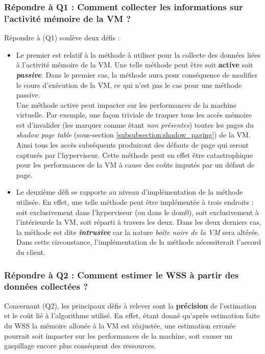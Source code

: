 \subsubsection{Répondre à Q1 : Comment collecter les informations sur l'activité mémoire de la VM ?}
Répondre à (Q1) soulève deux défis :
\begin{itemize}
    \item Le premier est relatif à la méthode à utiliser pour la collecte des données liées à l'activité mémoire de la VM. Une telle méthode peut être soit \textbf{active} soit \textbf{\textit{passive}}. Dans le premier cas, la méthode aura pour conséquence de modifier le cours d'exécution de la VM, ce qui n'est pas le cas pour une méthode passive.\\
    Une méthode active peut impacter sur les performances de la machine virtuelle. Par exemple, une façon triviale de traquer tous les accès mémoire est d'invalider (les marquer comme étant \textit{non présentes}) toutes les pages du \textit{shadow page table} (sous-section \ref{subsubsection:shadow_paging}) de la VM. Ainsi tous les accès subséquents produiront des défauts de page qui seront capturés par l'hyperviseur. Cette méthode peut en effet être catastrophique pour les performances de la VM à cause des coûts imputés par un défaut de page.
    
    \item Le deuxième défi se rapporte au niveau d'implémentation de la méthode utilisée. En effet, une telle méthode peut être implémentée à trois endroits : soit exclusivement dans l'hyperviseur (ou dans le dom0), soit exclusivement à l'intérieurde la VM, soit réparti à travers les deux. Dans les deux derniers cas, la méthode est dite \textbf{\textit{intrusive}} car la nature \textit{boîte noire de la VM} sera altérée. Dans cette circonstance, l'implémentation de la méthode nécessiterait l'accord du client.
\end{itemize}

\subsubsection{Répondre à Q2 : Comment estimer le WSS à partir des données collectées ?}
Concernant (Q2), les principaux défis à relever sont la \textbf{précision} de l'estimation et le coût lié à l'algorithme utilisé. En effet, étant donné qu'après estimation faite du WSS la mémoire allouée à la VM est réajustée, une estimation erronée pourrait soit impacter sur les performances de la machine, soit causer un gaspillage encore plus conséquent des ressources.

